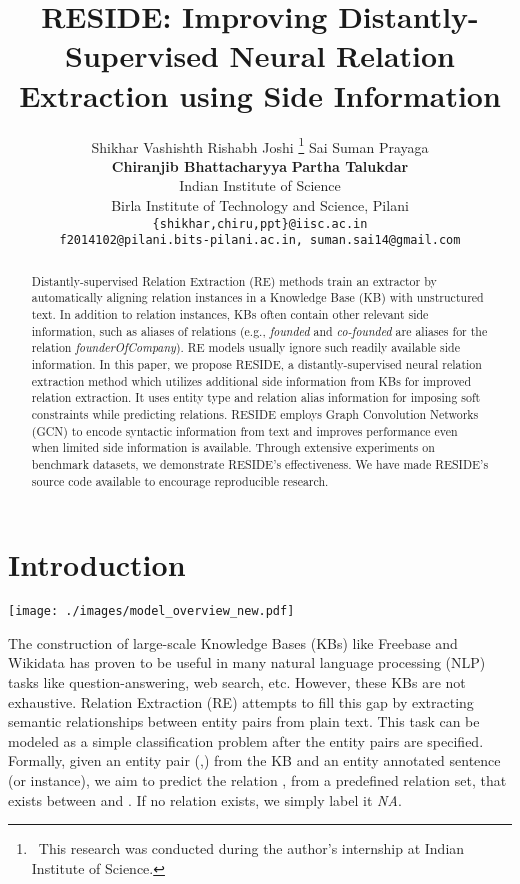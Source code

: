 \documentclass[11pt,a4paper]{article}
\title{RESIDE: Improving Distantly-Supervised Neural Relation Extraction using Side Information}
\author{Shikhar Vashishth \quad Rishabh Joshi \thanks{\, This research was conducted during the author's internship at Indian Institute of Science.} \quad Sai Suman Prayaga \quad \\ \textbf{Chiranjib Bhattacharyya} \quad 	\textbf{Partha Talukdar}\\
	 Indian Institute of Science\\
	 Birla Institute of Technology and Science, Pilani \\
	{\tt \small \{shikhar,chiru,ppt\}@iisc.ac.in} \\
	{\tt \small f2014102@pilani.bits-pilani.ac.in, suman.sai14@gmail.com} \\
}
\date{}
\newcommand{\reffig}[1]{Figure \ref{#1}}
\newcommand{\refsec}[1]{Section \ref{#1}}
\newcommand{\method}{RESIDE}
\newcommand{\lstm}{GRU}
\begin{document}
\maketitle
\begin{abstract}
Distantly-supervised Relation Extraction (RE) methods train an extractor by automatically aligning relation instances in a Knowledge Base (KB) with unstructured text. In addition to relation instances, KBs often contain other relevant side information, such as aliases of relations (e.g., \textit{founded} and \textit{co-founded} are aliases for the relation \textit{founderOfCompany}). RE models usually ignore such readily available side information. 
In this paper, we propose \method{}, a distantly-supervised neural relation extraction method which utilizes additional side information from KBs for improved relation extraction. It uses entity type and relation alias information for imposing soft constraints while predicting relations. 
\method{} employs Graph Convolution Networks (GCN) to encode syntactic information from text and improves performance even when limited side information is available. Through extensive experiments on benchmark datasets, we demonstrate \method{}'s effectiveness. We have made \method{}'s source code available to encourage reproducible research.
\end{abstract}

\section{Introduction}

\begin{figure*}[t]
	\centering
	\texttt{[image: ./images/model\_overview\_new.pdf]}
	\caption{\label{fig:model_overview}Overview of \method{}. \method{} first encodes each sentence in the bag by concatenating embeddings (denoted by ) from Bi-\lstm{} and Syntactic GCN for each token, followed by word attention. Then, sentence embedding is concatenated with relation alias information, which comes from the Side Information Acquisition Section (\reffig{fig:rel_alias}), before computing attention over sentences. Finally, bag representation with entity type information is fed to a softmax classifier. Please see \refsec{sec:details} for more details.}  
\end{figure*}


The construction of large-scale Knowledge Bases (KBs) like Freebase \cite{freebase_paper} and Wikidata \cite{wikidata_paper} has proven to be useful in many natural language processing (NLP) tasks like question-answering, web search, etc. However, these KBs are not exhaustive. Relation Extraction (RE) attempts to fill this gap by extracting semantic relationships between entity pairs from plain text. This task can be modeled as a simple classification problem after the entity pairs are specified. Formally, given an entity pair (,) from the KB and an entity annotated sentence (or instance), we aim to predict the relation , from a predefined relation set, that exists between  and . If no relation exists, we simply label it \textit{NA}.
\end{document}
